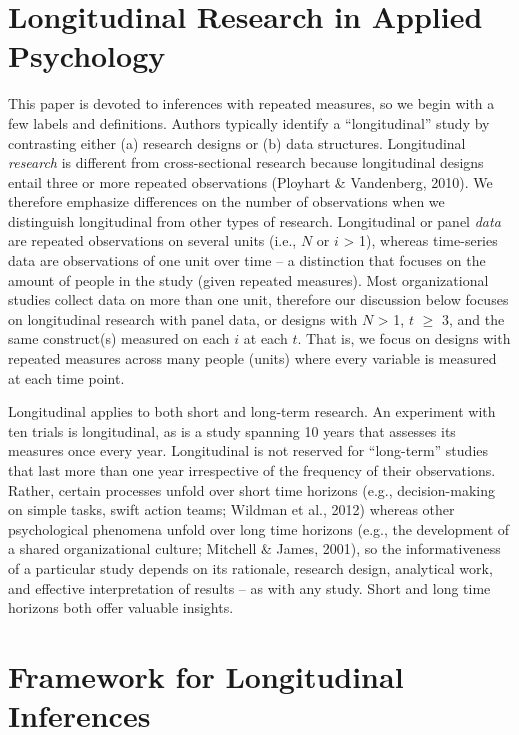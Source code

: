 \documentclass[english,,man]{apa6}
\theoremstyle{definition}
\theoremstyle{definition}
\theoremstyle{definition}
\theoremstyle{remark}
\begin{document}
\hypertarget{longitudinal-research-in-applied-psychology}{%
\section{Longitudinal Research in Applied
Psychology}\label{longitudinal-research-in-applied-psychology}}

This paper is devoted to inferences with repeated measures, so we begin
with a few labels and definitions. Authors typically identify a
\enquote{longitudinal} study by contrasting either (a) research designs
or (b) data structures. Longitudinal \emph{research} is different from
cross-sectional research because longitudinal designs entail three or
more repeated observations (Ployhart \& Vandenberg, 2010). We therefore
emphasize differences on the number of observations when we distinguish
longitudinal from other types of research. Longitudinal or panel
\emph{data} are repeated observations on several units (i.e., \(N\) or
\(i\) \textgreater{} 1), whereas time-series data are observations of
one unit over time -- a distinction that focuses on the amount of people
in the study (given repeated measures). Most organizational studies
collect data on more than one unit, therefore our discussion below
focuses on longitudinal research with panel data, or designs with \(N\)
\textgreater{} 1, \(t\) \(\geq\) 3, and the same construct(s) measured
on each \(i\) at each \(t\). That is, we focus on designs with repeated
measures across many people (units) where every variable is measured at
each time point.

Longitudinal applies to both short and long-term research. An experiment
with ten trials is longitudinal, as is a study spanning 10 years that
assesses its measures once every year. Longitudinal is not reserved for
\enquote{long-term} studies that last more than one year irrespective of
the frequency of their observations. Rather, certain processes unfold
over short time horizons (e.g., decision-making on simple tasks, swift
action teams; Wildman et al., 2012) whereas other psychological
phenomena unfold over long time horizons (e.g., the development of a
shared organizational culture; Mitchell \& James, 2001), so the
informativeness of a particular study depends on its rationale, research
design, analytical work, and effective interpretation of results -- as
with any study. Short and long time horizons both offer valuable
insights.

\hypertarget{framework-for-longitudinal-inferences}{%
\section{Framework for Longitudinal
Inferences}\label{framework-for-longitudinal-inferences}}
\end{document}
